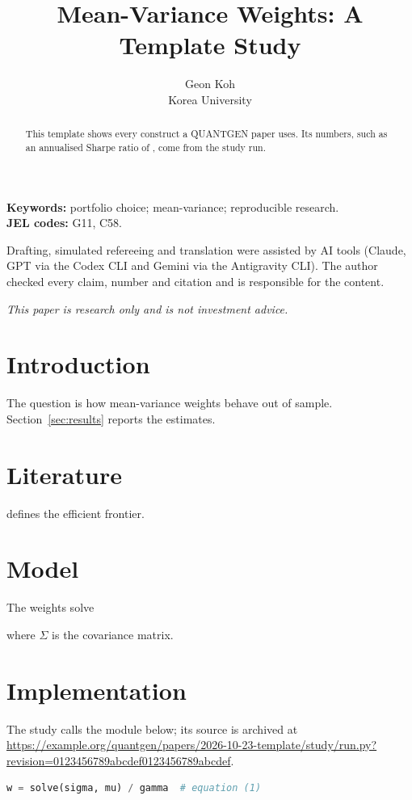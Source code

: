 \documentclass[11pt,a4paper]{article}
\title{Mean-Variance Weights: A Template Study}
\author{Geon Koh\\Korea University}
\date{}
\begin{document}
\maketitle
{}

\begin{abstract}
This template shows every construct a QUANTGEN paper uses. Its numbers, such as an annualised Sharpe ratio of , come from the study run.
\end{abstract}

\noindent\textbf{Keywords:} portfolio choice; mean-variance; reproducible research.\\
\noindent\textbf{JEL codes:} G11, C58.

\begin{aistatement}
Drafting, simulated refereeing and translation were assisted by AI tools (Claude, GPT via the Codex CLI and Gemini via the Antigravity CLI). The author checked every claim, number and citation and is responsible for the content.
\end{aistatement}

\noindent\emph{This paper is research only and is not investment advice.}

\section{Introduction}\label{sec:intro}
The question is how mean-variance weights behave out of sample. Section~\ref{sec:results} reports the estimates.

\section{Literature}\label{sec:literature}
\citet{markowitz1952} defines the efficient frontier.

\section{Model}\label{sec:model}
The weights solve

where \(\Sigma\) is the covariance matrix.

\section{Implementation}\label{sec:implementation}
The study calls the module below; its source is archived at \url{https://example.org/quantgen/papers/2026-10-23-template/study/run.py?revision=0123456789abcdef0123456789abcdef}.
\begin{lstlisting}[language=Python]
w = solve(sigma, mu) / gamma  # equation (1)
\end{lstlisting}
\end{document}
